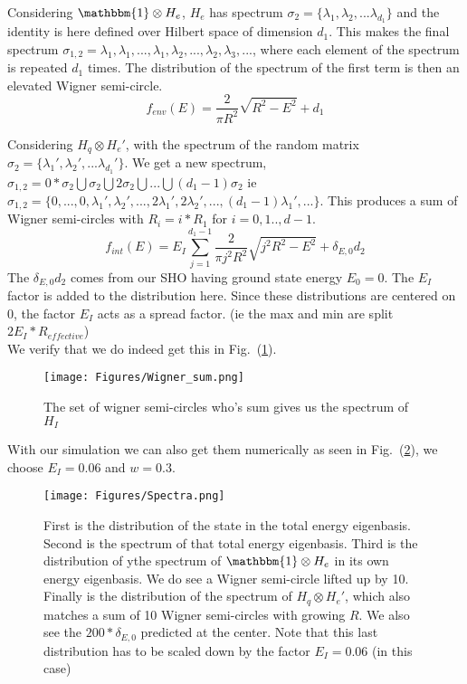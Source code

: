 \documentclass{article}
\begin{document}
Considering $\mathbbm{1}\otimes H_{e}$, $H_{e}$ has spectrum $\sigma_2=\{\lambda_1,\lambda_2,...\lambda_{d_1}\}$ and the identity is here defined over Hilbert space of dimension $d_1$. This makes  the final spectrum $\sigma_{1,2}={\lambda_1, \lambda_1, ..., \lambda_1, \lambda_2, ...,\lambda_2, \lambda_3, ...}$, where each element of the spectrum is repeated $d_1$ times. The distribution of the spectrum of the first term is then an elevated Wigner semi-circle.
\begin{equation}
    f_{env}(E) = \frac{2}{\pi R^2}\sqrt{R^2-E^2} + d_1
\end{equation}

Considering $H_q\otimes H_{e}'$, with the spectrum of the random matrix $\sigma_2=\{\lambda_1',\lambda_2',...\lambda_{d_1}'\}$. We get a new spectrum,  $\sigma_{1,2}=0*\sigma_2\bigcup\sigma_2\bigcup2\sigma_2\bigcup ...\bigcup(d_1-1)\sigma_2$ ie $\sigma_{1,2}= \{0,...,0,\lambda_1', \lambda_2', ..., 2\lambda_1', 2\lambda_2',..., (d_1-1)\lambda_1',...\}$. This produces a sum of Wigner semi-circles with $R_i=i*R_1$ for $i=0,1..,d-1$.
\begin{equation}
    f_{int}(E) = E_I\sum_{j=1}^{d_1-1}\frac{2}{\pi j^2R^2}\sqrt{j^2R^2-E^2} + \delta_{E,0}d_2
\end{equation}
The $\delta_{E,0}d_2$ comes from our SHO having ground state energy $E_0=0$. The $E_I$ factor is added to the distribution here. Since these distributions are centered on 0, the factor $E_I$ acts as a spread factor. (ie the max and min are split $2E_I*R_{effective}$)\\

We verify that we do indeed get this in Fig.~(\ref{fig:wigner_sum}). 

\begin{figure}[h]
    \centering
    \texttt{[image: Figures/Wigner\_sum.png]}
    \caption{The set of wigner semi-circles who's sum gives us the spectrum of $H_I$}
    \label{fig:wigner_sum}
\end{figure}

With our simulation we can also get them numerically as seen in Fig.~(\ref{fig:spectra}), we choose $E_I=0.06$ and $w=0.3$.
\begin{figure}
    \centering
    \texttt{[image: Figures/Spectra.png]}
    \caption{First is the distribution of the state in the total energy eigenbasis. Second is the spectrum of that total energy eigenbasis. Third is the distribution of ythe spectrum of $\mathbbm{1}\otimes H_e$ in its own energy eigenbasis. We do see a Wigner semi-circle lifted up by 10. Finally is the distribution of the spectrum of $H_q\otimes H_e'$, which also matches a sum of 10 Wigner semi-circles with growing $R$. We also see the $200*\delta_{E,0}$ predicted at the center. Note that this last distribution has to be scaled down by the factor $E_I=0.06$ (in this case)}
    \label{fig:spectra}
\end{figure}
\end{document}
